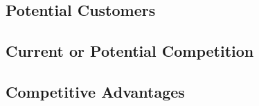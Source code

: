 
\subsection{Potential Customers}
\subsection{Current or Potential Competition}
\subsection{Competitive Advantages}
